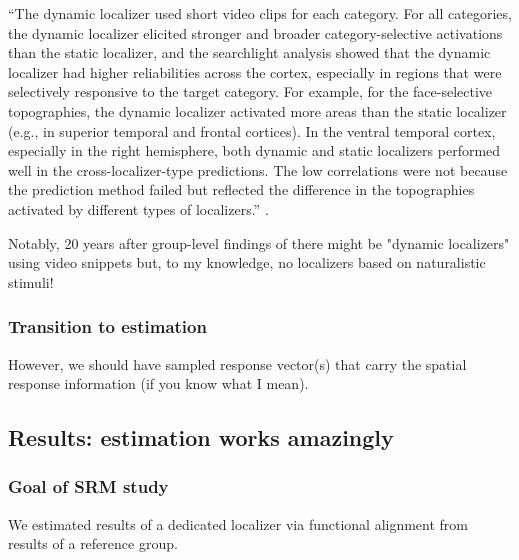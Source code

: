 %
``The dynamic localizer used short video clips for each category.
%
For all categories, the dynamic localizer elicited stronger and broader
category-selective activations than the static localizer, and the searchlight
analysis showed that the dynamic localizer had higher reliabilities across the
cortex, especially in regions that were selectively responsive to the target
category.
%
For example, for the face-selective topographies, the dynamic localizer
activated more areas than the static localizer (e.g., in superior temporal and
frontal cortices).
%
In the ventral temporal cortex, especially in the right hemisphere, both dynamic
and static localizers performed well in the cross-localizer-type predictions.
%
The low correlations were not because the prediction method failed but reflected
the difference in the topographies activated by different types of localizers.''
\citep{jiahui2022cross}.



Notably, 20 years after group-level findings of \citep{bartels2004mapping} there
might be "dynamic localizers" using video snippets
\citep{pitcher2011differential, fox2009defining} but, to my knowledge, no
localizers based on naturalistic stimuli!



\subsubsection{Transition to estimation}

%
However, we should have sampled response vector(s) that carry the spatial
response information (if you know what I mean).



\subsection{Results: estimation works amazingly}


\subsubsection{Goal of SRM study}
We estimated results of a dedicated localizer \citep{sengupta2016extension} via
functional alignment from results of a reference group.


